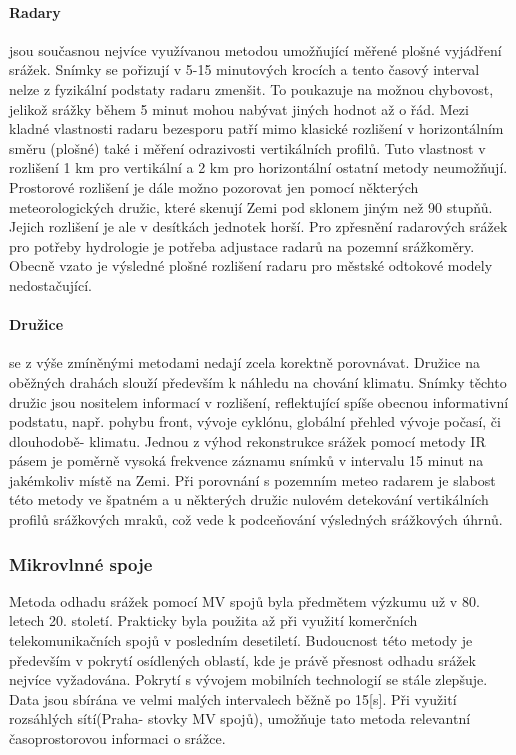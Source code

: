 \documentclass[a4paper,12pt,oneside]{report}
\begin{document}
\paragraph*{Radary}
jsou současnou nejvíce využívanou metodou umožňující měřené plošné vyjádření srážek. Snímky se pořizují v 5-15 minutových krocích a tento časový interval nelze z fyzikální podstaty radaru zmenšit. To poukazuje na možnou chybovost, jelikož srážky během 5 minut mohou nabývat jiných hodnot až o řád. Mezi kladné vlastnosti radaru bezesporu patří mimo klasické rozlišení v horizontálním směru (plošné) také i měření odrazivosti vertikálních profilů. Tuto vlastnost v rozlišení 1 km pro vertikální a 2 km pro horizontální ostatní metody neumožňují. Prostorové rozlišení je dále možno pozorovat jen pomocí některých meteorologických družic, které skenují Zemi pod sklonem jiným než 90 stupňů. Jejich rozlišení je ale v desítkách jednotek horší. Pro zpřesnění radarových srážek pro potřeby hydrologie je potřeba  adjustace radarů na pozemní srážkoměry. Obecně vzato je výsledné plošné rozlišení radaru pro městské odtokové modely nedostačující.   

\paragraph*{Družice} se z výše zmíněnými metodami nedají zcela korektně porovnávat. Družice na oběžných drahách slouží především k náhledu na chování klimatu. Snímky těchto družic jsou nositelem informací v rozlišení, reflektující spíše obecnou informativní podstatu, např. pohybu front, vývoje cyklónu, globální přehled vývoje počasí, či dlouhodobě- klimatu.
Jednou z výhod rekonstrukce srážek pomocí metody \acs{IR} pásem je poměrně vysoká frekvence záznamu snímků v intervalu 15 minut na jakémkoliv místě na Zemi. Při porovnání s pozemním meteo radarem je slabost této metody ve špatném a u některých družic nulovém detekování vertikálních profilů srážkových mraků, což vede k podceňování výsledných srážkových úhrnů.


\subsubsection{Mikrovlnné spoje}
Metoda odhadu srážek pomocí MV spojů byla předmětem výzkumu už v 80. letech 20. století. Prakticky byla použita až při využití komerčních telekomunikačních spojů v posledním desetiletí. Budoucnost této metody je především v pokrytí  osídlených oblastí, kde je právě přesnost odhadu srážek nejvíce vyžadována. Pokrytí s vývojem mobilních technologií se stále zlepšuje. Data jsou sbírána ve velmi malých intervalech běžně po 15[s]. Při využití rozsáhlých sítí(Praha- stovky MV spojů), umožňuje tato metoda relevantní časoprostorovou informaci o srážce.
 
\end{document}
